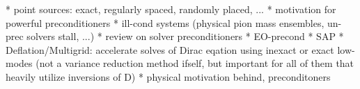 {	%
	* point sources: exact, regularly spaced, randomly placed, ...
* motivation for powerful preconditioners
	* ill-cond systems (physical pion mass ensembles, un-prec solvers stall, ...)
* review on solver preconditioners
	* EO-precond
	* SAP
	* Deflation/Multigrid: accelerate solves of Dirac eqation using inexact or exact low-modes (not a variance reduction method ifself, but important for all of them that heavily utilize inversions of D)
		* physical motivation behind, preconditoners
}

